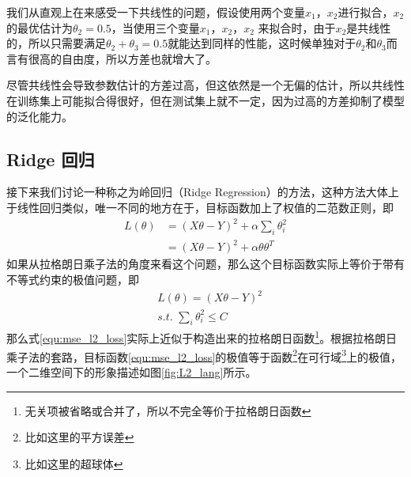 我们从直观上在来感受一下共线性的问题，假设使用两个变量$x_1$，$x_2$进行拟合，$x_2$的最优估计为$\theta_2 = 0.5$，当使用三个变量$x_1$，$x_2$，$x_2$ 来拟合时，由于$x_2$是共线性的，所以只需要满足$\theta_2 + \theta_3 = 0.5$就能达到同样的性能，这时候单独对于$\theta_2$和$\theta_3$而言有很高的自由度，所以方差也就增大了。

尽管共线性会导致参数估计的方差过高，但这依然是一个无偏的估计，所以共线性在训练集上可能拟合得很好，但在测试集上就不一定，因为过高的方差抑制了模型的泛化能力。




\subsection{Ridge 回归} %
\label{sub:ridge_回归}
接下来我们讨论一种称之为岭回归（Ridge Regression）的方法，这种方法大体上于线性回归类似，唯一不同的地方在于，目标函数加上了权值的二范数正则，即
\begin{equation}\label{equ:mse_l2_loss}
	\begin{split}
		L(\theta) &= (X\theta  - Y)^2 + \alpha \sum_i\theta_i^2\\
		 &= (X\theta - Y)^2 + \alpha \theta\theta^T
	\end{split}
\end{equation}
如果从拉格朗日乘子法的角度来看这个问题，那么这个目标函数实际上等价于带有不等式约束的极值问题，即
\begin{equation}
\begin{split}
	&L(\theta) = (X\theta - Y)^2 \\
    &s.t.\text{~} \sum_i\theta_i^2 \leq C
\end{split}
\end{equation}
那么式\ref{equ:mse_l2_loss}实际上近似于构造出来的拉格朗日函数\footnote{无关项被省略或合并了，所以不完全等价于拉格朗日函数}。根据拉格朗日乘子法的套路，目标函数\ref{equ:mse_l2_loss}的极值等于函数\footnote{比如这里的平方误差}在可行域\footnote{比如这里的超球体}上的极值，一个二维空间下的形象描述如图\ref{fig:L2_lang}所示。



